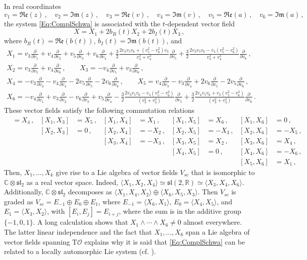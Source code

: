 \documentclass[11pt]{article}
\theoremstyle{plain}
\theoremstyle{definition}
\newcommand{\R}{\mathbb{R}}
\newcommand{\T}{\mathrm{T}}
\newcommand{\Rp}{\mathfrak{Re}}
\newcommand{\Ip}{\mathfrak{Im}}
\newcommand{\parder}[2]{\frac{\partial #1}{\partial #2}}
\numberwithin{equation}{section}
\begin{document}
In real coordinates
\[
v_1 = \Rp (z)\,,\quad v_2 = \Ip(z)\,,\quad v_3 = \Rp(v)\,,\quad v_4 = \Ip(v)\,,\quad v_5 = \Rp(a)\,,\quad v_6 = \Ip(a)\,,
\]
the system \eqref{Eq:ComplSchwa} is associated with the $t$-dependent vector field
$$
X=X_1+2b_R(t)X_2+2b_I(t)X_3\,,
$$
where $b_R(t) = \Rp(b(t))$, $b_I(t) = \Ip(b(t))$, and
\begin{gather*}
    X_1 = v_3\parder{}{v_1} + v_4\parder{}{v_2} + v_5\parder{}{v_3} + v_6\parder{}{v_4} + \frac{3}{2}\frac{2v_4v_5v_6 + (v_5^2 - v_6^2)v_3}{v_3^2 + v_4^2}\parder{}{v_5} + \frac{3}{2}\frac{2v_3v_5v_6 - v_4(v_5^2 - v_6^2)}{v_3^2 + v_4^2}\parder{}{v_6}\,,\\
    X_2 = v_3\parder{}{v_5} + v_4\parder{}{v_6}\,,\qquad X_3 = -v_4\parder{}{v_5} + v_3\parder{}{v_6}\,,\\
    X_4 = -v_3\parder{}{v_3} - v_4\parder{}{v_4} - 2v_5\parder{}{v_5} - 2v_6\parder{}{v_6}\,,\qquad X_5 = v_4\parder{}{v_3} - v_3\parder{}{v_4} + 2v_6\parder{}{v_5} - 2v_5\parder{}{v_6}\,,\\
    X_6 = -v_4\parder{}{v_1} + v_3\parder{}{v_2} - v_6\parder{}{v_3} + v_5\parder{}{v_4} - \frac{3}{2}\frac{2v_3v_5v_6 - v_4(v_5^2 - v_6^2)}{(v_3^2 + v_4^2)}\parder{}{v_5} + \frac{3}{2}\frac{2v_4v_5v_6 + v_3(v_5^2 - v_6^2)}{(v_3^2 + v_4^2)}\parder{}{v_6}\,.
\end{gather*}
These vector fields satisfy the following commutation relations
\begin{align}
    [X_1,X_2] &= X_4\,, & [X_1,X_3] &= X_5\,, & [X_1,X_4] &= X_1\,, & [X_1,X_5] &= X_6\,, & [X_1,X_6] &= 0\,,\\
    &&[X_2,X_3] &= 0\,, & [X_2,X_4] &= -X_2\,, & [X_2,X_5] &= -X_3\,, & [X_2,X_6] &= -X_5\,,\\
    &&&&[X_3,X_4] &= -X_3\,, & [X_3,X_5] &= X_2\,, & [X_3,X_6] &= X_4\,,\\
    &&&&&&[X_4,X_5] &= 0\,, & [X_4,X_6] &= -X_6\,,\\
    &&&&&&&&[X_5,X_6] &= X_1\,,
\end{align}
Then, $X_1,\ldots,X_k$ give rise to a Lie algebra of vector fields $V_{sc}$ that is isomorphic to $\mathbb{C}\otimes \mathfrak{sl}_2$ as a real vector space. Indeed, $\langle X_1,X_2,X_4\rangle \simeq \mathfrak{sl}(2,\R)\simeq\langle X_3,X_4,X_6\rangle $. Additionally, $\mathbb{C}\otimes \mathfrak{sl}_2$ decomposes as $\langle X_1,X_4,X_2\rangle\oplus \langle X_6,X_5,X_3\rangle$. Then $V_{sc}$ is graded as $V_{sc}=E_{-1}\oplus E_0\oplus E_1$, where $E_{-1}=\langle X_6,X_1\rangle$, $E_0=\langle X_4,X_5\rangle$, and $E_1=\langle X_3,X_2\rangle$, with $[E_i,E_j]=E_{i+j}$, where the sum is in the additive group $
\{-1,0,1\}$. A long calculation shows that $X_1\wedge\dotsb\wedge X_6\neq 0$ almost everywhere. The latter linear independence and the fact that $X_1,\ldots,X_6$ span a Lie algebra of vector fields spanning $\T\mathcal{O}$ explains  why it is said that \eqref{Eq:ComplSchwa} can be related to a locally automorphic Lie system (cf. \cite{GLMV_19}). 
\end{document}
